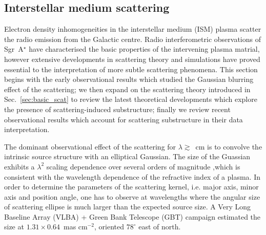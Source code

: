\subsection{Interstellar medium scattering}

Electron density inhomogeneities in the interstellar medium (ISM) plasma scatter the radio emission from the Galactic centre. Radio interferometric observations of Sgr~A$^\star$ have characterised the basic properties of the intervening plasma matrial, however extensive developments in scattering theory and simulations have proved essential to the interpretation of more subtle scattering phenomena. This section begins with the early observational results which studied the Gaussian blurring effect of the scattering; we then expand on the scattering theory introduced in Sec.~\ref{sec:basic_scat} to review the latest theoretical developments which explore the presence of scattering-induced substructure; finally we review recent observational results which account for scattering substructure in their data interpretation. 


The dominant observational effect of the scattering for $\lambda \gtrsim$~cm is to convolve the intrinsic source structure with an elliptical Gaussian. The size of the Guassian exhibits a $\lambda^2$ scaling dependence over several orders of magnitude \citep[Fig.~\ref{fig:scattering_law}][]{Backer_1978, Shen_2005, Bower_2006, Lu_2011},which is consistent with the wavelength dependence of the refractive index of a plasma. In order to determine the parameters of the scattering kernel, i.e. major axis, minor axis and position angle,  one has to observe at wavelengths where the angular size of scattering ellipse is much larger than the expected source size. A Very Long Baseline Array (VLBA) + Green Bank Telescope (GBT) campaign \cite{Bower_2006} estimated the size at $1.31 \times 0.64$~mas cm$^{-2}$, oriented $78^\circ$ east of north. 


